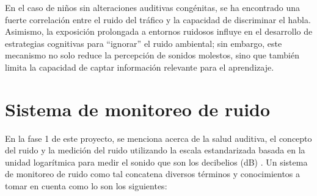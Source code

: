 {{En el caso de niños sin alteraciones auditivas congénitas, se ha encontrado una fuerte correlación entre el ruido del tráfico y la capacidad de discriminar el habla. Asimismo, la exposición prolongada a entornos ruidosos influye en el desarrollo de estrategias cognitivas para “ignorar” el ruido ambiental; sin embargo, este mecanismo no solo reduce la percepción de sonidos molestos, sino que también limita la capacidad de captar información relevante para el aprendizaje.

\section{Sistema de monitoreo de ruido}
En la fase 1 de este proyecto, se menciona acerca de la salud auditiva, el concepto del ruido y la medición del ruido utilizando la escala estandarizada basada en la unidad logarítmica para medir el sonido que son los decibelios (dB) \parencite{carpio2025}. Un sistema de monitoreo de ruido como tal concatena diversos términos y conocimientos a tomar en cuenta como lo son los siguientes: 

\begin{itemize}


\end{itemize}}}
